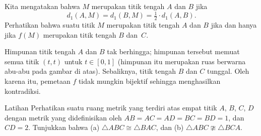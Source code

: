 Kita mengatakan bahwa $M$ merupakan titik tengah $A$ dan $B$ jika 
\[d_1(A,M)=d_1(B,M)=\tfrac12\cdot d_1(A,B).\]
Perhatikan bahwa suatu titik $M$ merupakan titik tengah $A$ dan $B$ jika dan hanya jika $f(M)$ merupakan titik tengah $B$ dan~$C$.

Himpunan titik tengah $A$ dan $B$ tak berhingga; himpunan tersebut memuat semua titik $(t,t)$ untuk $t\in[0,1]$ (himpunan itu merupakan ruas berwarna abu-abu pada gambar di atas).
Sebaliknya, titik tengah $B$ dan $C$ tunggal.
Oleh karena itu, pemetaan $f$ tidak mungkin bijektif sehingga menghasilkan kontradiksi.

\begin{thm}{Latihan}\label{ex:ncong}
Perhatikan suatu ruang metrik yang terdiri atas empat titik $A$, $B$, $C$, $D$ dengan metrik yang didefinisikan oleh $AB=AC=AD=BC=BD=1$, dan 
$CD=2$.
Tunjukkan bahwa (a) $\triangle ABC\cong \triangle BAC$, dan (b) $\triangle ABC\ncong \triangle BCA$.
\end{thm}

